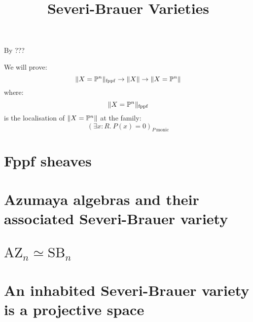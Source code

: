 \documentclass{../util/zariski}
\title{Severi-Brauer Varieties}
\newcommand{\SB}{\mathrm{SB}}
\newcommand{\AZ}{\mathrm{AZ}}
\begin{document}
\maketitle

By ???

We will prove:
\[\lVert X=\mathbb{P}^n \rVert_{\mathrm{fppf}} \to \lVert X \rVert \to \lVert X=\mathbb{P}^n \rVert\]
where:
\[\lVert X=\mathbb{P}^n \rVert_{\mathrm{fppf}}\]
is the localisation of $\lVert X=\mathbb{P}^n \rVert$ at the family: 
\[(\exists x:R.\ P(x)=0)_{P\ \mathrm{monic}}\]
\tableofcontents

\section{Fppf sheaves}


\section{Azumaya algebras and their associated Severi-Brauer variety}


\section{$\AZ_n\simeq \SB_n$}


\section{An inhabited Severi-Brauer variety is a projective space}


\printindex

\printbibliography
\end{document}
